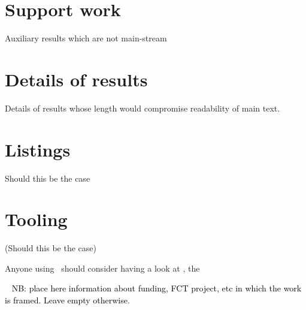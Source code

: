\documentclass[
  oneside,
  11pt, a4paper,
  footinclude=true,
  headinclude=true,
  cleardoublepage=empty
]{scrbook}
\begin{document}
\chapter{Support work}
	Auxiliary results which are not main-stream

\chapter{Details of results}
         Details of results whose length would compromise readability of main text.

\chapter{Listings}
	Should this be the case

\chapter{Tooling}
	(Should this be the case)

	Anyone using \Latex\ should consider having a look at \TUG,
	the 
	
\begin{backcover}
\thispagestyle{empty} \pagecolor{white} \textcolor{black} {\selectfont ~\vfill
\noindent
NB: place here information about funding, FCT project, etc in which the work is framed. Leave empty otherwise.
%
\vfill ~}
\end{backcover}
\end{document}

